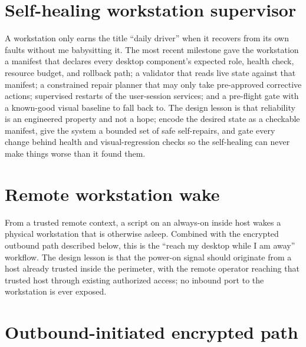 \documentclass[12pt]{article}
\begin{document}
\section{Self-healing workstation supervisor}

A workstation only earns the title ``daily driver'' when it recovers from its own faults without me babysitting it. The most recent milestone gave the workstation a manifest that declares every desktop component's expected role, health check, resource budget, and rollback path; a validator that reads live state against that manifest; a constrained repair planner that may only take pre-approved corrective actions; supervised restarts of the user-session services; and a pre-flight gate with a known-good visual baseline to fall back to. The design lesson is that reliability is an engineered property and not a hope; encode the desired state as a checkable manifest, give the system a bounded set of safe self-repairs, and gate every change behind health and visual-regression checks so the self-healing can never make things worse than it found them.

\section{Remote workstation wake}

From a trusted remote context, a script on an always-on inside host wakes a physical workstation that is otherwise asleep. Combined with the encrypted outbound path described below, this is the ``reach my desktop while I am away'' workflow. The design lesson is that the power-on signal should originate from a host already trusted inside the perimeter, with the remote operator reaching that trusted host through existing authorized access; no inbound port to the workstation is ever exposed.

\section{Outbound-initiated encrypted path}
\end{document}
